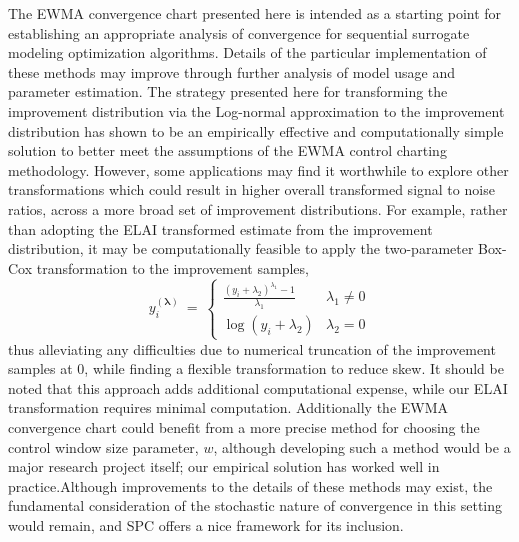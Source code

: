 \documentclass{article}
\begin{document}
%
%

The EWMA convergence chart presented here is intended as a starting point for 
establishing an appropriate analysis of convergence for sequential surrogate 
modeling optimization algorithms. Details of the particular implementation of 
these methods may improve through further analysis of model usage and 
parameter estimation. The strategy presented here for transforming the 
improvement distribution via the Log-normal approximation to the improvement 
distribution has shown to be an empirically effective and computationally 
simple solution to better meet the assumptions of the EWMA control charting 
methodology. However, some applications may find it worthwhile to explore 
other transformations which could result in higher overall transformed signal 
to noise ratios, across a more broad set of improvement distributions. For 
example, rather than adopting the ELAI transformed estimate from the 
improvement distribution, it may be computationally feasible to apply the 
two-parameter Box-Cox transformation \citep{boxCox1964} to the improvement 
samples,
\begin{equation}
y_i^{(\bm{\lambda})}~=~
\begin{cases}
        \frac{( y_i + \lambda_2 )^{\lambda_1} - 1}{\lambda_1} & \lambda_1\neq0\\
        \log(y_i+\lambda_2) & \lambda_2=0
\end{cases}
\end{equation}
thus alleviating any difficulties due to numerical truncation of the 
improvement samples at 0, while finding a flexible transformation to reduce 
skew. It should be noted that this approach adds additional computational 
expense, while our ELAI transformation requires minimal computation. 
Additionally the EWMA convergence chart could benefit from a more precise 
method for choosing the control window size parameter, $w$, although 
developing such a method would be a major research project itself; our 
empirical solution has worked well in practice.Although improvements to the 
details of these methods may exist, the fundamental consideration of the 
stochastic nature of convergence in this setting would remain, and SPC offers 
a nice framework for its inclusion. 
\end{document}

